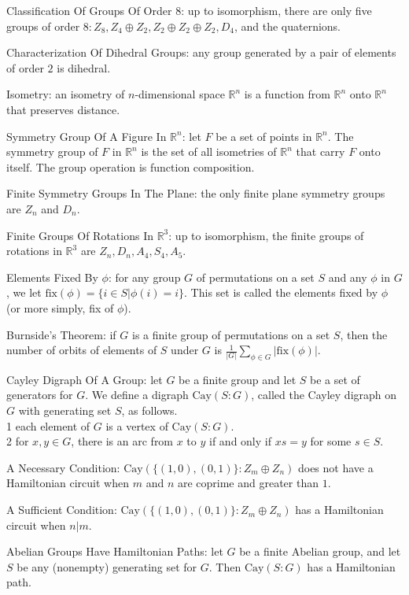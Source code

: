 Classification Of Groups Of Order $8$: up to isomorphism, there are only five groups of order $8:Z_8, Z_4 \oplus Z_2, Z_2 \oplus Z_2 \oplus Z_2, D_4$, and the quaternions.

Characterization Of Dihedral Groups: any group generated by a pair of elements of order $2$ is dihedral.

Isometry: an isometry of $n$-dimensional space $\mathbb{R}^n$ is a function from $\mathbb{R}^n$ onto $\mathbb{R}^n$ that preserves distance.

Symmetry Group Of A Figure In $\mathbb{R}^n$: let $F$ be a set of points in $\mathbb{R}^n$. The symmetry group of $F$ in $\mathbb{R}^n$ is the set of all isometries of $\mathbb{R}^n$ that carry $F$ onto itself. The group operation is function composition.

Finite Symmetry Groups In The Plane: the only finite plane symmetry groups are $Z_n$ and $D_n$.

Finite Groups Of Rotations In $\mathbb{R}^3$: up to isomorphism, the finite groups of rotations in $\mathbb{R}^3$ are $Z_n,D_n,A_4,S_4,A_5$.

Elements Fixed By $\phi$: for any group $G$ of permutations on a set $S$ and any $\phi$ in $G$, we let $\text{fix}(\phi)=\{i \in S | \phi (i)=i \}$. This set is called the elements fixed by $\phi$ (or more simply, fix of $\phi$).

Burnside's Theorem: if $G$ is a finite group of permutations on a set $S$, then the number of orbits of elements of $S$ under $G$ is $\frac{1}{|G|}\sum_{\phi \in G} |\text{fix}(\phi)|$.

Cayley Digraph Of A Group: let $G$ be a finite group and let $S$ be a set of generators for $G$. We define a digraph $\text{Cay}(S:G)$, called the Cayley digraph on $G$ with generating set $S$, as follows. \\
1 each element of $G$ is a vertex of $\text{Cay}(S:G)$. \\
2 for $x,y \in G$, there is an arc from $x$ to $y$ if and only if $xs=y$ for some $s \in S$.

A Necessary Condition: $\text{Cay}(\{(1,0),(0,1) \}:Z_m \oplus Z_n)$ does not have a Hamiltonian circuit when $m$ and $n$ are coprime and greater than $1$.

A Sufficient Condition: $\text{Cay}(\{(1,0),(0,1) \}:Z_m \oplus Z_n)$ has a Hamiltonian circuit when $n | m$.

Abelian Groups Have Hamiltonian Paths: let $G$ be a finite Abelian group, and let $S$ be any (nonempty) generating set for $G$. Then $\text{Cay}(S:G)$ has a Hamiltonian path.

